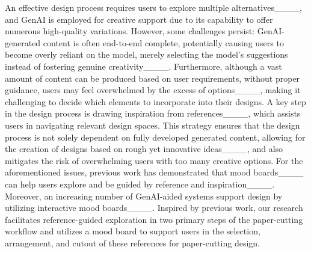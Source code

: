 An effective design process requires users to explore multiple alternatives____, and GenAI is employed for creative support due to its capability to offer numerous high-quality variations. However, some challenges persist: GenAI-generated content is often end-to-end complete, potentially causing users to become overly reliant on the model, merely selecting the model's suggestions instead of fostering genuine creativity____. Furthermore, although a vast amount of content can be produced based on user requirements, without proper guidance, users may feel overwhelmed by the excess of options____, making it challenging to decide which elements to incorporate into their designs. A key step in the design process is drawing inspiration from references____, which assists users in navigating relevant design spaces. This strategy ensures that the design process is not solely dependent on fully developed generated content, allowing for the creation of designs based on rough yet innovative ideas____, and also mitigates the risk of overwhelming users with too many creative options. 
For the aforementioned issues, previous work has demonstrated that mood boards____ can help users explore and be guided by reference and inspiration____. Moreover, an increasing number of GenAI-aided systems support design by utilizing interactive mood boards____. Inspired by previous work, our research facilitates reference-guided exploration in two primary steps of the paper-cutting workflow and utilizes a mood board to support users in the selection, arrangement, and cutout of these references for paper-cutting design.